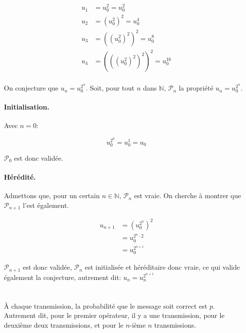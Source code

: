 \documentclass{article}
\newcommand{\N}{\mathds{N}}
\newcommand{\qed}{\square}
\newcommand{\spliteq}[1]{\begin{equation*}\begin{split}#1\end{split}\end{equation*}}
\begin{document}
\section{}

\spliteq{
	u_1 &= u_0^2 = u_0^2\\
	u_2 &= (u_0^2)^2 = u_0^4 \\
	u_3 &= ((u_0^2)^2)^2 = u_0^8\\
	u_4 &= (((u_0^2)^2)^2)^2 = u_0^{16} \\
}

On conjecture que $u_n = u_0^{2^n}$.
Soit, pour tout $n$ dans $\N$, $\mathcal{P}_n$ la propriété $u_n = u_0^{2^n}$.

\paragraph{Initialisation.} Avec $n=0$:

\[
	u_0^{2^0} = u_0^1 = u_0
\]

$\mathcal{P}_0$ est donc validée.


\paragraph{Hérédité.} Admettons que, pour un certain $n \in \N$, $\mathcal{P}_{n}$ est vraie. On cherche à montrer que $\mathcal{P}_{n+1}$ l'est également.

\spliteq{
	u_{n+1} &= (u_0^{2^n})^2 \\
		&= u_0^{2^n\cdot2} \\
		&= u_0^{2^{n+1}}
}

$\mathcal{P}_{n+1}$ est donc validée, $\mathcal{P}_{n}$ est initialisée et héréditaire donc vraie, ce qui valide également la conjecture, autrement dit: $u_n = u_n^{2^{n+1}}$ \qed


\section{}

\section{}

\section{}

À chaque transmission, la probabilité que le message soit correct est $p$. Autrement dit,
pour le premier opérateur, il y a une transmission, pour le deuxième deux transmissions,
et pour le $n$-ième $n$ transmissions.
\end{document}

